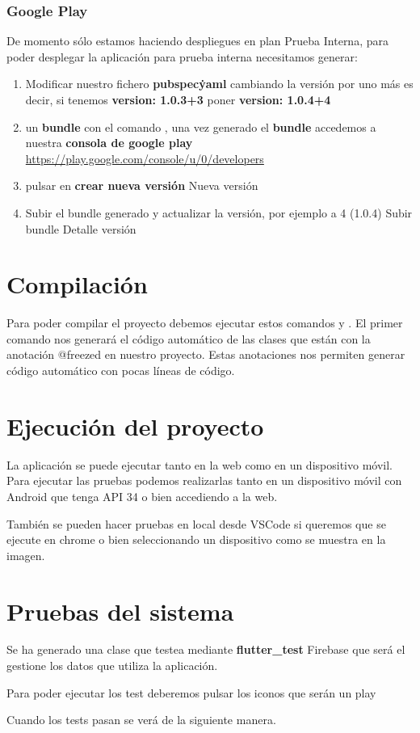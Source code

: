 \subsubsection{Google Play}
De momento sólo estamos haciendo despliegues en plan Prueba Interna, para poder desplegar la aplicación para prueba interna necesitamos generar:
\begin{enumerate}
	\item Modificar nuestro fichero \textbf{pubspec\.yaml} cambiando la versión por uno más es decir, si tenemos \textbf{version: 1.0.3+3} poner \textbf{version: 1.0.4+4}
	\item un \textbf{bundle} con el comando \fboxrule=1pt\fboxsep=4pt, una vez generado el \textbf{bundle} accedemos a nuestra \textbf{consola de google play} \url{https://play.google.com/console/u/0/developers}
	\item pulsar en \textbf{crear nueva versión}
 {Nueva versión}
	\item Subir el bundle generado y actualizar la versión, por ejemplo a 4 (1.0.4)
 {Subir bundle}
 {Detalle versión}
\end{enumerate}

\section{Compilación}
Para poder compilar el proyecto debemos ejecutar estos comandos \fboxrule=1pt\fboxsep=4pt y \fboxrule=1pt\fboxsep=4pt. El primer comando nos generará el código automático de las clases que están con la anotación @freezed en nuestro proyecto. Estas anotaciones nos permiten generar código automático con pocas líneas de código.

\section{Ejecución del proyecto}
La aplicación se puede ejecutar tanto en la web como en un dispositivo móvil. Para ejecutar las pruebas podemos realizarlas tanto en un dispositivo móvil con Android que tenga API 34 o bien accediendo a la web.

También se pueden hacer pruebas en local desde VSCode \fboxrule=1pt\fboxsep=4pt si queremos que se ejecute en chrome o bien seleccionando un dispositivo como se muestra en la imagen.

\section{Pruebas del sistema}
Se ha generado una clase que testea mediante \textbf{flutter\_test} Firebase que será el gestione los datos que utiliza la aplicación.

Para poder ejecutar los test deberemos pulsar los iconos que serán un play

Cuando los tests pasan se verá de la siguiente manera.
